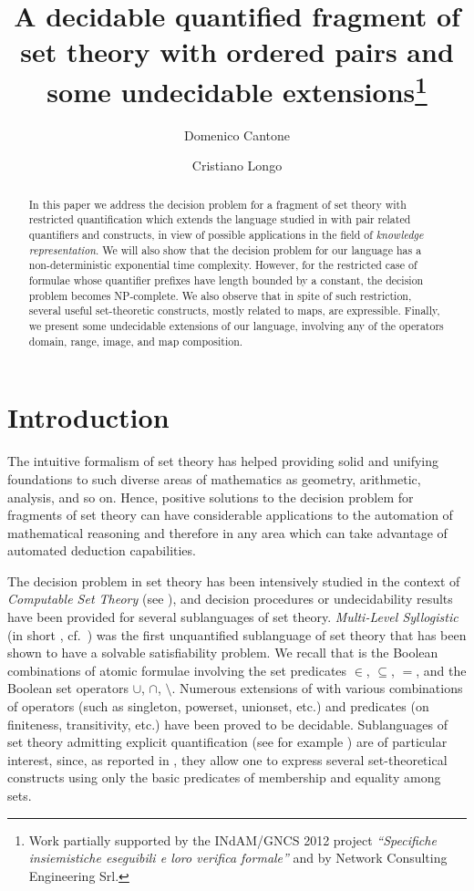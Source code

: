 \documentclass[submission,copyright,creativecommons]{eptcs}
\title{A decidable quantified fragment of set theory with ordered
pairs and some undecidable extensions\thanks{Work partially supported
by the INdAM/GNCS 2012 project
\emph{``Specifiche insiemistiche ese\-guibili e loro verifica 
formale''} and by Network Consulting Engineering Srl.}}
\author{Domenico Cantone
\institute{Department of Mathematics and Computer Science\\
University of Catania, Italy}
\email{cantone@dmi.unict.it}
\and
Cristiano Longo
\institute{Network Consulting Engineering\\
Valverde, Catania, Italy} \email{cristiano.longo@nce.eu} }
\begin{document}
\maketitle

\begin{abstract}
In this paper we address the decision problem for a fragment of set
theory with restricted quantification which extends the language
studied in \cite{BreFerOmoSch1981} with pair related quantifiers and
constructs, in view of possible applications in the field of
\emph{knowledge representation}.
We will also show that the decision problem for our language has a
non-deterministic exponential time complexity.  However, for the
restricted case of formulae whose quantifier prefixes have length
bounded by a constant, the decision problem becomes
\textsc{NP}-complete.  We also observe that in spite of such
restriction, several useful set-theoretic constructs, mostly related
to maps, are expressible.  Finally, we present some undecidable
extensions of our language, involving any of the operators domain,
range, image, and map composition.
\end{abstract}



\section{Introduction}\label{INTRO}

The intuitive formalism of set theory has helped providing solid and
unifying foundations to such diverse areas of mathematics as geometry,
arithmetic, analysis, and so on.
Hence, positive solutions to the decision problem for fragments of
set theory can have considerable applications to the automation of
mathematical reasoning and therefore in any area which can take
advantage of automated deduction capabilities.

The decision problem in set theory has been intensively studied
in the context of \emph{Computable Set Theory} (see
\cite{CanFerOmo89a,CanOmoPol01,SchCanOmo11}), and decision
procedures or undecidability results have been provided for several
sublanguages of set theory.
\emph{Multi-Level Syllogistic} (in short \mls, cf.\
\cite{FerOmoSch1980}) was the first unquantified sublanguage of set
theory that has been shown to have a solvable satisfiability problem.
We recall that \mls is the Boolean combinations of atomic formulae
involving the set predicates $\in$, $\subseteq$, $=$, and the Boolean
set operators $\cup$, $\cap$, $\setminus$.  Numerous
extensions of \mls with various combinations of operators (such as
singleton, powerset, unionset, etc.)  and predicates (on finiteness,
transitivity, etc.)  have been proved to be decidable.  Sublanguages
of set theory admitting explicit quantification (see for example
\cite{BreFerOmoSch1981, OmoPol2010, OmoPol2012, CanLonNic2011}) are of
particular interest, since, as reported in \cite{BreFerOmoSch1981},
they allow one to express several set-theoretical constructs using
only the basic predicates of membership and equality among sets.
\end{document}
